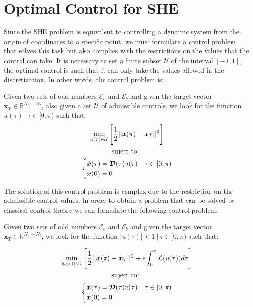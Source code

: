 
\section{Optimal Control for SHE}

Since the SHE problem is equivalent to controlling a dynamic system from the origin of coordinates to a specific point, we must formulate a control problem that solves this task but also complies with the restrictions on the values that the control can take. It is necessary to set a finite subset $ \mathcal {U} $ of the interval $ [- 1,1] $, the optimal control is such that it can only take the values allowed in the discretization. In other words, the control problem is:

\begin{problem}\label{OCP1}
    Given two sets of odd numbers $ \mathcal {E} _a $ and $ \mathcal {E} _b $ and given the target vector $ \bm {x} _T \in \mathbb {R} ^ {N_a + N_b} $, also given a set $ \mathcal {U} $ of admissible controls, we look for the function $ u (\tau) \ | \ \tau \in [0, \pi) $ such that:
    \begin{gather}
        \min_{u(\tau) \in \mathcal{U}}         
         \Bigg[ \frac{1}{2}|| \bm{x}(\pi) - \bm{x}_T  ||^2 \Bigg]  \\
        \notag \text{suject to: } \\
        \begin{cases}
            \dot{\bm{x}}(\tau) = \bm{\mathcal{D}}(\tau) u(\tau)  & \tau \in [0,\pi)\\
            \bm{x}(0) = {0}
        \end{cases}
    \end{gather}
\end{problem}
%
The solution of this control problem is complex due to the restriction on the admissible control values.
%
In order to obtain a problem that can be solved by classical control theory we can formulate the following control problem:

\begin{problem}\label{OCP1}
    Given two sets of odd numbers $ \mathcal {E} _a $ and $ \mathcal {E} _b $ and given the target vector $ \bm {x} _T \in \mathbb {R} ^ {N_a + N_b} $, we look for the function $ |u (\tau)|<1 \ | \ \tau \in [0, \pi) $ such that:

    \begin{gather}
        \min_{|u(\tau) |<1}         
         \Bigg[ \frac{1}{2}|| \bm{x}(\pi) - \bm{x}_T  ||^2  
        + \epsilon \int_0^{\pi} \mathcal{L}(u(\tau)) d\tau \Bigg]  \\
        \notag \text{suject to: } \\
        \begin{cases}
            \dot{\bm{x}}(\tau) = \bm{\mathcal{D}}(\tau) u(\tau)  & \tau \in [0,\pi)\\
            \bm{x}(0) = {0}
        \end{cases}
    \end{gather}
\end{problem}

